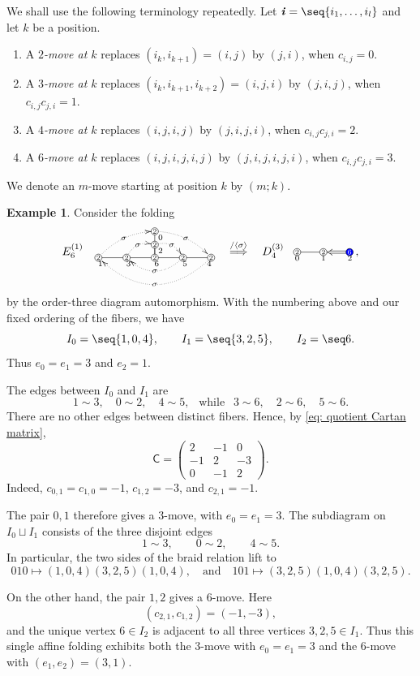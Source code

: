 \documentclass[12pt, leqno]{amsart}
\numberwithin{equation}{section}
\theoremstyle{plain}
\theoremstyle{definition}
\newtheorem{example}[lemma]{Example}
\newcommand{\ii}{ \textbf{\textit{i}}}
\newcommand*\circled[1]{ \fontsize{6}{6}\selectfont \tikz[baseline=(char.base)]{
  \node[shape=circle,draw,inner sep=0.4pt] (char) {#1};} \fontsize{12}{12}\selectfont }
\newcommand*\rcircled[1]{\fontsize{6}{6}\selectfont \tikz[baseline=(char.base)]{
    \node[shape=circle, fill= blue, draw=black, text=white, inner sep=0.4pt] (char) {#1};} \fontsize{12}{12}\selectfont}
\newcommand{\sfC}{\mathsf{C}}
\newcommand{\qtq}[1][{and}]{\quad\text{{#1}}\quad}
\newcommand{\ee}{\end{enumerate}}
\newcommand{\bnum}{\begin{enumerate}[{\rm (i)}]}
\newcommand{\ang}[1]{\langle#1\rangle}
\begin{document}
We shall use the following terminology repeatedly. Let $\ii=\seq{i_1,\ldots,i_l}$ and let $k$ be a position.
\bnum
\item A \emph{$2$-move at $k$} replaces $(i_k,i_{k+1})=(i,j)$ by $(j,i)$, when $c_{i,j}=0$.
\item A \emph{$3$-move at $k$} replaces $(i_k,i_{k+1},i_{k+2})=(i,j,i)$ by $(j,i,j)$, when $c_{i,j}c_{j,i}=1$.
\item A \emph{$4$-move at $k$} replaces $(i,j,i,j)$ by $(j,i,j,i)$, when $c_{i,j}c_{j,i}=2$.
\item A \emph{$6$-move at $k$} replaces $(i,j,i,j,i,j)$ by $(j,i,j,i,j,i)$, when $c_{i,j}c_{j,i}=3$.
\ee
We denote an $m$-move starting at position $k$ by $(m;k)$.

\begin{example}\label{ex: E6 D43 rank two orbit}
Consider the folding
\[
E_6^{(1)}\ \
\raisebox{2.1em}{
\xymatrix@R=1ex@C=4.2ex{
&& *{\circled{2}}<3pt>
\ar@{}[r]_<{ \ 0 }
   \ar@{-}[d] \ar@/^0.5pc/@{.>}[ddrr]|{\sigma} & \\
&& *{\circled{2}}<3pt> \ar@{-}[d]
   \ar@{-}[d] \ar@/^0.5pc/@{.>}[dr]|{\sigma}
   \ar@{}[r]_<{ \ 2 } & \\
*{\circled{2}}<3pt>\ar@{-}[r]_<{  1 \ }
\ar@/^0.5pc/@{.>}[uurr]|{\sigma}
& *{\circled{2}}<3pt> \ar@{-}[r]_<{ 3 \ }
\ar@/^0.5pc/@{.>}[ur]|{\sigma}
& *{\circled{2}}<3pt> \ar@{-}[r]_<{ 6 \ } & *{\circled{2}}<3pt> \ar@{-}[r]_<{ 5 \ }
\ar@/^1pc/@{.>}[ll]|{\sigma}
& *{\circled{2}}<3pt> \ar@{}[l]^<{ \ 4  }
\ar@/^2pc/@{.>}[llll]|{\sigma}
}}
\quad
\overset{/\ang{\sigma}}{\Longrightarrow}
\quad
D_4^{(3)}\ \
\xymatrix@R=0.5ex@C=3.8ex{
*{\circled{2}}<3pt>  \ar@{-}[r]_<{0\ \ }
&
*{\circled{2}}<3pt> \ar@{<=}[r]_<{1\ \ }
&
*{\rcircled{6}}<3pt> \ar@{}[l]^>{\qquad \qquad 2}
},
\]
by the order-three diagram automorphism. With the numbering above and our fixed ordering of the fibers, we have
\[
I_0=\seq{1,0,4},\qquad I_1=\seq{3,2,5},\qquad I_2=\seq6.
\]
Thus $e_0=e_1=3$ and $e_2=1$.

The edges between $I_0$ and $I_1$ are
\[
1\sim3,\quad 0\sim2,\quad 4\sim5, \ \ \text{ while } \ \ 3\sim6,\quad 2\sim6,\quad 5\sim6.
\]
There are no other edges between distinct fibers. Hence, by
\eqref{eq: quotient Cartan matrix},
\[
\sfC=
\begin{pmatrix}
2&-1&0\\
-1&2&-3\\
0&-1&2
\end{pmatrix}.
\]
Indeed,
$c_{0,1}=c_{1,0}=-1$,  $c_{1,2}=-3$, and $c_{2,1}=-1$.

The pair $0,1$ therefore gives a $3$-move, with
$e_0=e_1=3$.
 The subdiagram on $I_0\sqcup I_1$ consists of the three disjoint edges
\[
1\sim3,\qquad 0\sim2,\qquad 4\sim5.
\]
In particular, the two sides of the braid relation lift to
\[
010 \longmapsto (1,0,4)(3,2,5)(1,0,4), \qtq 101 \longmapsto (3,2,5)(1,0,4)(3,2,5).
\]

On the other hand, the pair $1,2$ gives a $6$-move. Here
\[
(c_{2,1},c_{1,2})=(-1,-3),
\]
and the unique vertex $6\in I_2$ is adjacent to all three vertices
$3,2,5\in I_1$. Thus this single affine folding exhibits both the
$3$-move with $e_0=e_1=3$ and the $6$-move with
$(e_1,e_2)=(3,1)$.
\end{example}
\end{document}
